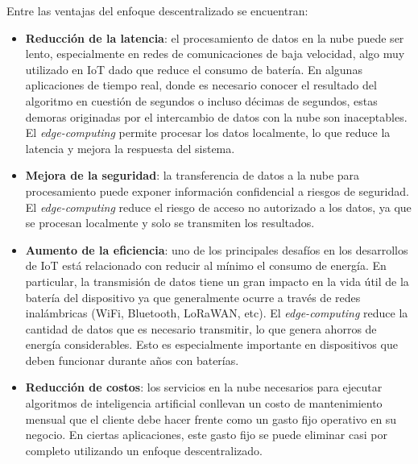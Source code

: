\documentclass[
11pt, %
codirector, %
]{charter}
\begin{document}
Entre las ventajas del enfoque descentralizado se encuentran:
\begin{itemize}
\item \textbf{Reducción de la latencia}: el procesamiento de datos en la nube puede ser lento, especialmente en redes de comunicaciones de baja velocidad, algo muy utilizado en IoT dado que reduce el consumo de batería. En algunas aplicaciones de tiempo real, donde es necesario conocer el resultado del algoritmo en cuestión de segundos o incluso décimas de segundos, estas demoras originadas por el intercambio de datos con la nube son inaceptables. El \textit{edge-computing} permite procesar los datos localmente, lo que reduce la latencia y mejora la respuesta del sistema.
\item \textbf{Mejora de la seguridad}: la transferencia de datos a la nube para procesamiento puede exponer información confidencial a riesgos de seguridad. El \textit{edge-computing} reduce el riesgo de acceso no autorizado a los datos, ya que se procesan localmente y solo se transmiten los resultados.
\item \textbf{Aumento de la eficiencia}: uno de los principales desafíos en los desarrollos de IoT está relacionado con reducir al mínimo el consumo de energía. En particular, la transmisión de datos tiene un gran impacto en la vida útil de la batería del dispositivo ya que generalmente ocurre a través de redes inalámbricas (WiFi, Bluetooth, LoRaWAN, etc). El \textit{edge-computing} reduce la cantidad de datos que es necesario transmitir, lo que genera ahorros de energía considerables. Esto es especialmente importante en dispositivos que deben funcionar durante años con baterías.
\item \textbf{Reducción de costos}: los servicios en la nube necesarios para ejecutar algoritmos de inteligencia artificial conllevan un costo de mantenimiento mensual que el cliente debe hacer frente como un gasto fijo operativo en su negocio. En ciertas aplicaciones, este gasto fijo se puede eliminar casi por completo utilizando un enfoque descentralizado. 
\end{itemize}
\end{document}
